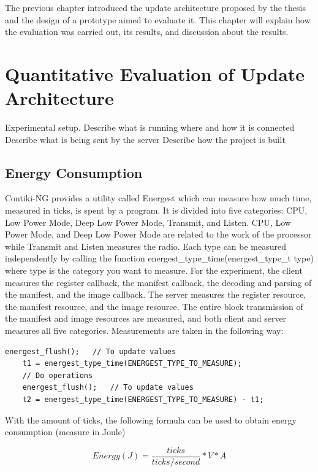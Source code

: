 \documentclass[0-thesis.tex]{subfiles}
\begin{document}
The previous chapter introduced the update architecture proposed by the thesis and the
design of a prototype aimed to evaluate it. This chapter will explain how the evaluation
was carried out, its results, and discussion about the results.

\section{Quantitative Evaluation of Update Architecture}
\label{sec:quant-evaluation}

Experimental setup.
Describe what is running where and how it is connected
Describe what is being sent by the server
Describe how the project is built

\subsection{Energy Consumption}
\label{ssec:energy-consumption}
Contiki-NG provides a utility called Energest which can measure how much time, measured in
ticks, is spent by a program. It is divided into five categories: CPU, Low Power Mode,
Deep Low Power Mode, Transmit, and Listen. CPU, Low Power Mode, and Deep Low Power Mode
are related to the work of the processor while Transmit and Listen measures the radio.
Each type can be measured independently by calling the function
energest\_type\_time(energest\_type\_t type) where type is the category you want to measure.
For the experiment, the client measures the register callback, the manifest callback, the
decoding and parsing of the manifest, and the image callback. The server measures the
register resource, the manifest resource, and the image resource. The entire block
transmission of the manifest and image resources are measured, and both client and server
measures all five categories. Measurements are taken in the following way:

\begin{lstlisting}[language=manifest, caption={How to measure ticks in energest.}, label=lst:energest]
    energest_flush();   // To update values
    t1 = energest_type_time(ENERGEST_TYPE_TO_MEASURE);
    // Do operations
    energest_flush();   // To update values
    t2 = energest_type_time(ENERGEST_TYPE_TO_MEASURE) - t1;
\end{lstlisting}

With the amount of ticks, the following formula can be used to obtain energy consumption
(measure in Joule)

$$ Energy (J) = \frac{ticks}{ticks/second} * V * A $$
\end{document}

